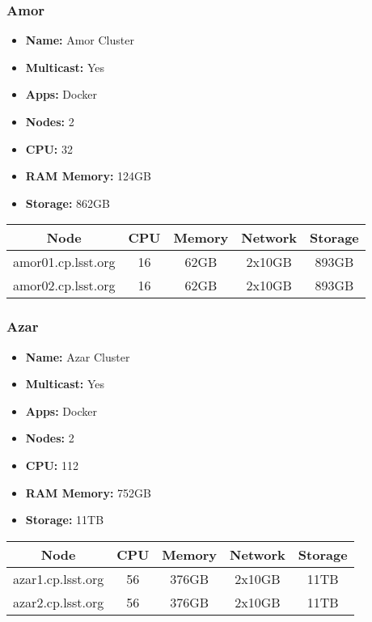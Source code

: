 \subsubsection{Amor}
\begin{itemize}
  \itemsep0em 
  \item \textbf{Name:}       Amor Cluster
  \item \textbf{Multicast:}  Yes
  \item \textbf{Apps:}       Docker
  \item \textbf{Nodes:}      2
  \item \textbf{CPU:}        32
  \item \textbf{RAM Memory:} 124GB
  \item \textbf{Storage:}   862GB
\end{itemize}
\begin{center}
  \small
  \begin{tabular}{||c c c c c||}
    \hline
    \textbf{Node} & \textbf{CPU} & \textbf{Memory} & \textbf{Network} & \textbf{Storage} \\ [0.5ex]
    \hline
    amor01.cp.lsst.org & 16 & 62GB & 2x10GB & 893GB \\
    \hline
    amor02.cp.lsst.org & 16 & 62GB & 2x10GB & 893GB \\
    \hline
  \end{tabular}
\end{center}

\subsubsection{Azar}
\begin{itemize}
  \itemsep0em 
  \item \textbf{Name:}       Azar Cluster
  \item \textbf{Multicast:}  Yes
  \item \textbf{Apps:}       Docker
  \item \textbf{Nodes:}      2
  \item \textbf{CPU:}        112
  \item \textbf{RAM Memory:} 752GB
  \item \textbf{Storage:}   11TB
\end{itemize}
\begin{center}
  \small
  \begin{tabular}{||c c c c c||}
    \hline
    \textbf{Node} & \textbf{CPU} & \textbf{Memory} & \textbf{Network} & \textbf{Storage} \\ [0.5ex]
    \hline
    azar1.cp.lsst.org & 56 & 376GB & 2x10GB & 11TB \\
    \hline
    azar2.cp.lsst.org & 56 & 376GB & 2x10GB & 11TB \\
    \hline
  \end{tabular}
\end{center}


